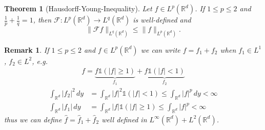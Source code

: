 \documentclass{report}
\theoremstyle{tommy}
\newtheorem{thm}[defn]{Theorem}
\newtheorem{rem}[defn]{Remark}
\begin{document}
  \begin{thm}[Hausdorff-Young-Inequality]\label{hausdorff-young}
    Let \(f \in L^p(\mathbb{R}^d)\). If \(1 \le p \le 2\) and \(\frac{1}{p} + \frac{1}{q} = 1\), then \(\mathcal{F}: L^p(\mathbb{R}^d) \to L^q(\mathbb{R}^d)\) is well-defined and
    \[\|\mathcal{F}f\|_{L^q(\mathbb{R}^d)} \le \|f\|_{L^p(\mathbb{R}^d)}.\]
  \end{thm}
  
  \begin{rem}
    If \(1 \le p \le 2\) and \(f \in L^p(\mathbb{R}^d)\) we can write \(f = f_1 + f_2\) when \(f_1 \in L^1\), \(f_2 \in L^2\), e.g.
    \begin{align*}
      f = \underbrace{f \mathbb{1}(|f| \ge 1)}_{f_1} + \underbrace{f \mathbb{1}(|f| < 1)}_{f_2}
    \end{align*}
    \begin{align*}
      \int_{\mathbb{R}^d} |f_2|^2 \, dy &= \int_{\mathbb{R}^d}|f|^2 \mathbb{1}(|f| < 1) \le \int_{\mathbb{R}^d} |f|^p \, dy < \infty \\
      \int_{\mathbb{R}^d} |f_1| \, dy &= \int_{\mathbb{R}^d} |f| \mathbb{1}(|f| \ge 1) \le \int_{\mathbb{R}^d} |f|^p < \infty
    \end{align*}
    thus we can define \(\hat f = \hat f_1 + \hat f_2\) well defined in \(L^\infty(\mathbb{R}^d) + L^2(\mathbb{R}^d)\).
  \end{rem}
    
\end{document}
